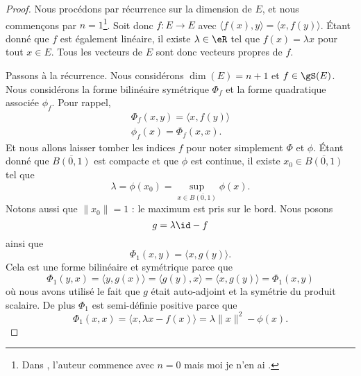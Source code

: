 \begin{proof}
    Nous procédons par récurrence sur la dimension de \( E\), et nous commençons par \( n=1\)\footnote{Dans \cite{KXjFWKA}, l'auteur commence avec \( n=0\) mais moi je n'en ai .}. Soit donc \( f\colon E\to E\) avec \( \langle f(x), y\rangle =\langle x, f(y)\rangle \). Étant donné que \( f\) est également linéaire, il existe \( \lambda\in \eR\) tel que \( f(x)=\lambda x\) pour tout \( x\in E\). Tous les vecteurs de \( E\) sont donc vecteurs propres de \( f\).

    Passons à la récurrence. Nous considérons \( \dim(E)=n+1\) et \( f\in\gS(E)\). Nous considérons la forme bilinéaire symétrique \( \Phi_f\) et la forme quadratique associée \( \phi_f\). Pour rappel,
    \begin{subequations}
        \begin{align}
        \Phi_f(x,y)=\langle x, f(y)\rangle \\
        \phi_f(x)=\Phi_f(x,x).
        \end{align}
    \end{subequations}
    Et nous allons laisser tomber les indices \( f\) pour noter simplement \( \Phi\) et \( \phi\). Étant donné que \( \overline{ B(0,1) }\) est compacte et que \( \phi\) est continue, il existe \( x_0\in\overline{ B(0,1) }\) tel que 
    \begin{equation}
        \lambda=\phi(x_0)=\sup_{x\in\overline{ B(0,1) }}\phi(x).
    \end{equation}
    Notons aussi que \( \| x_0 \|=1\) : le maximum est pris sur le bord. Nous posons
    \begin{equation}
        g=\lambda\id-f
    \end{equation}
    ainsi que 
    \begin{equation}
        \Phi_1(x,y)=\langle x, g(y)\rangle .
    \end{equation}
    Cela est une forme bilinéaire et symétrique parce que
    \begin{equation}
        \Phi_1(y,x)=\langle y, g(x)\rangle =\langle g(y), x\rangle =\langle x, g(y)\rangle =\Phi_1(x,y)
    \end{equation}
    où nous avons utilisé le fait que \( g\) était auto-adjoint et la symétrie du produit scalaire. De plus \( \Phi_1\) est semi-définie positive parce que
    \begin{equation}
        \Phi_1(x,x)=\langle x, \lambda x-f(x)\rangle =\lambda\| x \|^2-\phi(x).
    \end{equation}

\end{proof}
